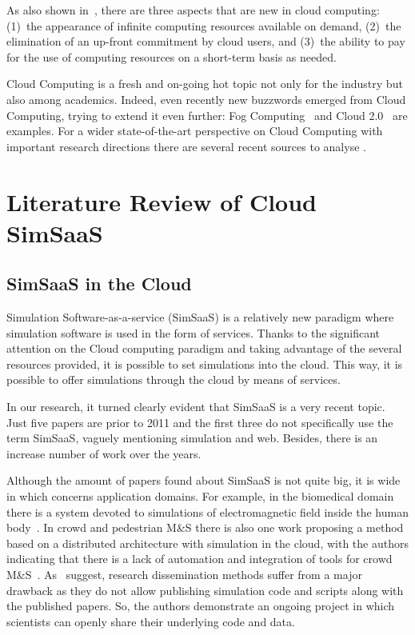 \documentclass[conference]{IEEEtran}
\begin{document}
As also shown in~\cite{armbrust2010view}, there are three aspects that are new in cloud computing: (1)~the appearance of infinite computing resources available on demand, (2)~the elimination of an up-front commitment by cloud users, and (3)~the ability to pay for the use of computing resources on a short-term basis as needed.

Cloud Computing is a fresh and on-going hot topic not only for the industry but also among academics. Indeed, even recently new buzzwords emerged from Cloud Computing, trying to extend it even further: Fog Computing~\cite{bonomi2012fog} and Cloud 2.0~\cite{miluzzo2014m} are examples. For a wider state-of-the-art perspective on Cloud Computing with important research directions there are several recent sources to analyse \cite{gonzalez2015cloud} \cite{zhang2010cloud} \cite{Sun2014134} \cite{Abdelmaboud2015159} \cite{he2014state} \cite{abolfazli2015mobile}.


\section{Literature Review of Cloud SimSaaS}

\subsection{SimSaaS in the Cloud}

Simulation Software-as-a-service (SimSaaS) is a relatively new paradigm where simulation software is used in the form of services. Thanks to the significant attention on the Cloud computing paradigm and taking advantage of the several resources provided, it is possible to set simulations into the cloud. This way, it is possible to offer simulations through the cloud by means of services. 

In our research, it turned clearly evident that SimSaaS is a very recent topic. Just five papers are prior to 2011 and the first three do not specifically use the term SimSaaS, vaguely mentioning simulation and web. Besides, there is an increase number of work over the years.

Although the amount of papers found about SimSaaS is not quite big, it is wide in which concerns application domains. For example, in the biomedical domain there is a system devoted to simulations of electromagnetic field inside the human body~\cite{Sawicki20121190}. In crowd and pedestrian M\&S there is also one work proposing a method based on a distributed architecture with simulation in the cloud, with the authors indicating that there is a lack of automation and integration of tools for crowd M\&S~\cite{Wang:2015:SSM:2723553.2723554}. As~\cite{Sliman2013611} suggest, research dissemination methods suffer from a major drawback as they do not allow publishing simulation code and scripts along with the published papers. So, the authors demonstrate an ongoing project in which scientists can openly share their underlying code and data.
\end{document}
